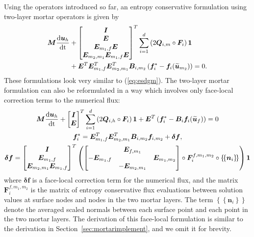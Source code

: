 \documentclass{svjour3}                     %
\renewcommand{\tilde}{\widetilde}
\newcommand{\td}[2]{\frac{{\rm d}#1}{{\rm d}{\rm #2}}}
\newcommand{\LRp}[1]{\left( #1 \right)}
\newcommand{\LRc}[1]{\left\{ #1 \right\}}
\newcommand{\avg}[1] {\ensuremath{\LRc{\!\LRc{#1}\!}}}
\begin{document}
Using the operators introduced so far, an entropy conservative formulation using two-layer mortar operators is given by  
\begin{align}
{\bm{M}}\td{\bm{u}_h}{t} &+ \begin{bmatrix} \bm{I} \\ \bm{E} \\ \bm{E}_{m_1,f}\bm{E} \\ \bm{E}_{m_2,m_1}\bm{E}_{m_1,f}\bm{E} \end{bmatrix}^T
\sum_{i=1}^d \LRp{2{\bm{Q}}_{i,m} \circ \bm{F}_i}\bm{1} \label{eq:twomortar}\\
&+ \bm{E}^T \bm{E}_{m_1,f}^T\bm{E}_{m_2, m_1}^T{\bm{B}}_{i,m_2}\LRp{\bm{f}_i^*-\bm{f}_i(\tilde{\bm{u}}_{m_2})} = 0.
\end{align}
These formulations look very similar to (\ref{eq:esdgm}).  The two-layer mortar formulation can also be reformulated in a way which involves only face-local correction terms to the numerical flux:
\begin{gather}
{\bm{M}}\td{\bm{u}_h}{t} + \begin{bmatrix} \bm{I} \\ \bm{E} \end{bmatrix}^T
\sum_{i=1}^d \LRp{2{\bm{Q}}_{i,h} \circ \bm{F}_i}\bm{1} + \bm{E}^T\LRp{\bm{f}_i^*- \bm{B}_i\bm{f}_i(\tilde{\bm{u}}_f)} = 0\\
\bm{f}_i^* = \bm{E}_{m_1,f}^T\bm{E}_{m_2,m_1}^T{\bm{B}}_{i,m_2}\bm{f}_{i,m_2} + \bm{\delta f},\nonumber\\
\bm{\delta f} = \begin{bmatrix}
\bm{I}\\
\bm{E}_{m_1,f}\\
\bm{E}_{m_2,m_1}\bm{E}_{m_1,f}
\end{bmatrix}^T
\LRp{\begin{bmatrix}
& \bm{E}_{f,m_1} & \\
-\bm{E}_{m_1,f} & & \bm{E}_{m_1,m_2}\\
& -\bm{E}_{m_2,m_1}& 
\end{bmatrix}\circ \bm{F}_i^{f,m_1,m_2} \circ \avg{\bm{n}_i}}\bm{1}\nonumber
\end{gather}
where $\bm{\delta f}$ is a face-local correction term for the numerical flux, and the matrix $\bm{F}_i^{f,m_1,m_2}$ is the matrix of entropy conservative flux evaluations between solution values at surface nodes and nodes in the two mortar layers.  The term $\avg{\bm{n}_i}$ denote the averaged scaled normals between each surface point and each point in the two mortar layers.  The derivation of this face-local formulation is similar to the derivation in Section~\ref{sec:mortarimplement}, and we omit it for brevity.  
\end{document}
